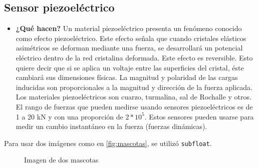 \begin{figure}[h]
	\centering
\end{figure}



	\subsection*{Sensor piezoeléctrico}
\begin{itemize}
	\item \textbf{¿Qué hacen?} 
	Un material piezoeléctrico presenta un fenómeno conocido como efecto piezoeléctrico. Este efecto señala que cuando cristales elásticos asimétricos se deforman mediante una fuerza, se desarrollará un potencial eléctrico dentro de la red cristalina deformada. Este efecto es reversible. Esto quiere decir que si se aplica un voltaje entre las superficies del cristal, éste cambiará sus dimensiones físicas. La magnitud y polaridad de las cargas inducidas son proporcionales a la magnitud y dirección de la fuerza aplicada. Los materiales piezoeléctricos son cuarzo, turmalina, sal de Rochalle y otros. El rango de fuerzas que pueden medirse usando sensores piezoeléctricos es de 1 a 20 kN y con una proporción de $2*10^{5}.$ 
	Estos sensores pueden usarse para medir un cambio instantáneo en la fuerza (fuerzas dinámicas). \cite{IngMecafenix_SensorPiezoelectrico}
	
\end{itemize}


Para usar dos imágenes como en \autoref{fig:mascotas}, se utilizó \texttt{subfloat}.
\begin{figure}[h]
	\centering
	\hfill
	\caption{Imagen de dos mascotas}
	\label{fig:mascotas}
\end{figure}
